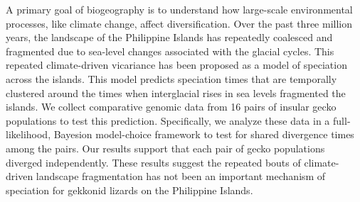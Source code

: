A primary goal of biogeography is to understand how large-scale environmental
processes, like climate change, affect diversification.
Over the past three million years, the landscape of the Philippine Islands has
repeatedly coalesced and fragmented due to sea-level changes associated with
the glacial cycles.
This repeated climate-driven vicariance has been proposed as a model of
speciation across the islands.
This model predicts speciation times that are temporally clustered around
the times when interglacial rises in sea levels fragmented the islands.
We collect comparative genomic data from 16 pairs of insular gecko populations
to test this prediction.
Specifically, we analyze these data in a full-likelihood, Bayesion model-choice
framework to test for shared divergence times among the pairs.
Our results support that each pair of gecko populations diverged independently.
These results suggest the repeated bouts of climate-driven landscape
fragmentation has not been an important mechanism of speciation for
gekkonid lizards on the Philippine Islands.
